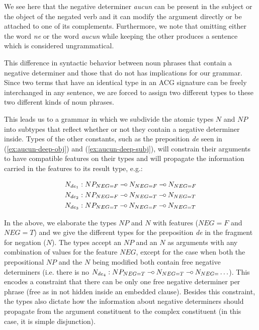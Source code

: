 \documentclass{llncs}
\def\limp {\mathbin{{-}\mkern-3.5mu{\circ}}}
\begin{document}
We see here that the negative determiner \emph{aucun} can be present in
the subject or the object of the negated verb and it can modify the
argument directly or be attached to one of its complements. Furthermore,
we note that omitting either the word \emph{ne} or the word \emph{aucun}
while keeping the other produces a sentence which is considered
ungrammatical.

This difference in syntactic behavior between noun phrases that contain a
negative determiner and those that do not has implications for our
grammar. Since two terms that have an identical type in an ACG signature can
be freely interchanged in any sentence, we are forced to assign two different
types to these two different kinds of noun phrases.


This leads us to a grammar in which we subdivide the atomic types $N$
and $NP$ into subtypes that reflect whether or not they contain a
negative determiner inside. Types of the other constants, such as the
preposition \emph{de} seen in (\ref{ex:aucun-deep-obj}) and
(\ref{ex:aucun-deep-subj}), will constrain their arguments to have
compatible features on their types and will propagate the information
carried in the features to its result type, e.g.:

\vspace{-4ex}

\begin{align*}
N_{de_1} &: NP_{NEG{=}F} \limp N_{NEG{=}F} \limp N_{NEG{=}F} \\
N_{de_2} &: NP_{NEG{=}F} \limp N_{NEG{=}T} \limp N_{NEG{=}T} \\
N_{de_3} &: NP_{NEG{=}T} \limp N_{NEG{=}F} \limp N_{NEG{=}T}
\end{align*}

\vspace{-1ex}

In the above, we elaborate the types $NP$ and $N$ with features ($NEG{=}F$
and $NEG{=}T$) and we give the different types for the preposition \emph{de}
in the fragment for negation ($N$). The types accept an $NP$ and an $N$ as
arguments with any combination of values for the feature $NEG$, except for the
case when both the prepositional $NP$ and the $N$ being modified both contain
free negative determiners (i.e. there is no $N_{de_4} : NP_{NEG{=}T} \limp
N_{NEG{=}T} \limp N_{NEG{=}}\ldots$). This encodes a constraint that there can
be only one free negative determiner per phrase (free as in not hidden inside
an embedded clause). Besides this constraint, the types also dictate how the
information about negative determiners should propagate from the argument
constituent to the complex constituent (in this case, it is simple
disjunction).
\end{document}
